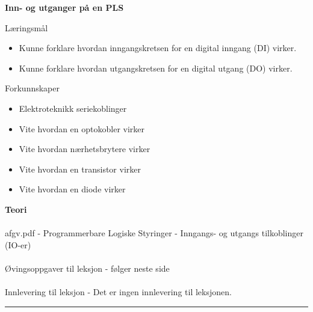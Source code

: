 \centerline{\bf Inn- og utganger på en PLS}  \bigskip
	Læringsmål
	\begin{itemize}[noitemsep]
		\item Kunne forklare hvordan inngangskretsen for en digital inngang (DI) virker. 
		\item Kunne forklare hvordan utgangskretsen for en digital utgang (DO) virker. 
	\end{itemize}

	Forkunnskaper

	\begin{itemize}[noitemsep]
		\item Elektroteknikk seriekoblinger
		\item Vite hvordan en optokobler virker
		\item Vite hvordan nærhetsbrytere virker
		\item Vite hvordan en transistor virker
		\item Vite hvordan en diode virker

	\end{itemize}
\textbf{Teori}\\\\
afgv.pdf - Programmerbare Logiske Styringer - Inngangs- og utgangs tilkoblinger (IO-er)\\\\
Øvingsoppgaver til leksjon - følger neste side\\\\
Innlevering til leksjon - Det er ingen innlevering til leksjonen. 
\bigskip 
\hrule
\vfil \eject
